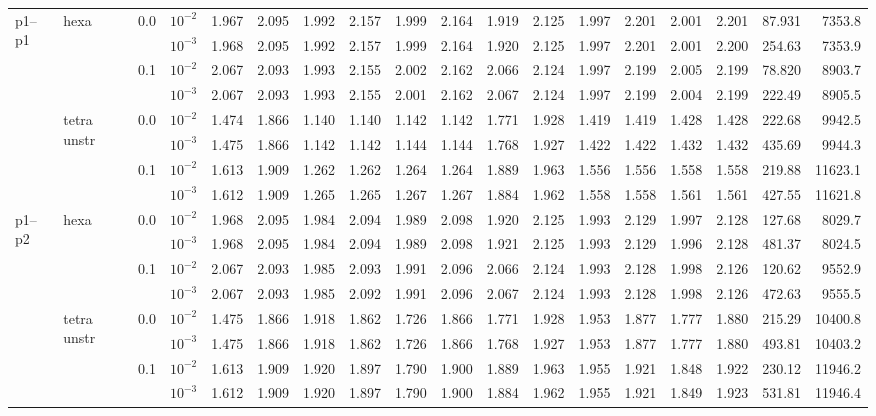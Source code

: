 \begin{longtable}{llclrrrrrrrrrrrrrr}
\multirow{8}{*}{p1--p1} & \multirow{4}{*}{hexa} & \multirow{2}{*}{0.0} & $10^{-2}$ & 1.967 & 2.095 & 1.992 & 2.157 & 1.999 & 2.164 & 1.919 & 2.125 & 1.997 & 2.201 & 2.001 & 2.201 & 87.931 & 7353.8 \\
& & & $10^{-3}$ & 1.968 & 2.095 & 1.992 & 2.157 & 1.999 & 2.164 & 1.920 & 2.125 & 1.997 & 2.201 & 2.001 & 2.200 & 254.63 & 7353.9 \\\cline{3-18}
& & \multirow{2}{*}{0.1} & $10^{-2}$ & 2.067 & 2.093 & 1.993 & 2.155 & 2.002 & 2.162 & 2.066 & 2.124 & 1.997 & 2.199 & 2.005 & 2.199 & 78.820 & 8903.7 \\
& & & $10^{-3}$ & 2.067 & 2.093 & 1.993 & 2.155 & 2.001 & 2.162 & 2.067 & 2.124 & 1.997 & 2.199 & 2.004 & 2.199 & 222.49 & 8905.5 \\\cline{2-18}
& \multirow{4}{*}{tetra unstr} & \multirow{2}{*}{0.0} & $10^{-2}$ & 1.474 & 1.866 & 1.140 & 1.140 & 1.142 & 1.142 & 1.771 & 1.928 & 1.419 & 1.419 & 1.428 & 1.428 & 222.68 & 9942.5 \\
& & & $10^{-3}$ & 1.475 & 1.866 & 1.142 & 1.142 & 1.144 & 1.144 & 1.768 & 1.927 & 1.422 & 1.422 & 1.432 & 1.432 & 435.69 & 9944.3 \\\cline{3-18}
& & \multirow{2}{*}{0.1} & $10^{-2}$ & 1.613 & 1.909 & 1.262 & 1.262 & 1.264 & 1.264 & 1.889 & 1.963 & 1.556 & 1.556 & 1.558 & 1.558 & 219.88 & 11623.1 \\
& & & $10^{-3}$ & 1.612 & 1.909 & 1.265 & 1.265 & 1.267 & 1.267 & 1.884 & 1.962 & 1.558 & 1.558 & 1.561 & 1.561 & 427.55 & 11621.8 \\\hline

\multirow{8}{*}{p1--p2} & \multirow{4}{*}{hexa} & \multirow{2}{*}{0.0} & $10^{-2}$ & 1.968 & 2.095 & 1.984 & 2.094 & 1.989 & 2.098 & 1.920 & 2.125 & 1.993 & 2.129 & 1.997 & 2.128 & 127.68 & 8029.7 \\
& & & $10^{-3}$ & 1.968 & 2.095 & 1.984 & 2.094 & 1.989 & 2.098 & 1.921 & 2.125 & 1.993 & 2.129 & 1.996 & 2.128 & 481.37 & 8024.5 \\\cline{3-18}
& & \multirow{2}{*}{0.1} & $10^{-2}$ & 2.067 & 2.093 & 1.985 & 2.093 & 1.991 & 2.096 & 2.066 & 2.124 & 1.993 & 2.128 & 1.998 & 2.126 & 120.62 & 9552.9 \\
& & & $10^{-3}$ & 2.067 & 2.093 & 1.985 & 2.092 & 1.991 & 2.096 & 2.067 & 2.124 & 1.993 & 2.128 & 1.998 & 2.126 & 472.63 & 9555.5 \\\cline{2-18}
& \multirow{4}{*}{tetra unstr} & \multirow{2}{*}{0.0} & $10^{-2}$ & 1.475 & 1.866 & 1.918 & 1.862 & 1.726 & 1.866 & 1.771 & 1.928 & 1.953 & 1.877 & 1.777 & 1.880 & 215.29 & 10400.8 \\
& & & $10^{-3}$ & 1.475 & 1.866 & 1.918 & 1.862 & 1.726 & 1.866 & 1.768 & 1.927 & 1.953 & 1.877 & 1.777 & 1.880 & 493.81 & 10403.2 \\\cline{3-18}
& & \multirow{2}{*}{0.1} & $10^{-2}$ & 1.613 & 1.909 & 1.920 & 1.897 & 1.790 & 1.900 & 1.889 & 1.963 & 1.955 & 1.921 & 1.848 & 1.922 & 230.12 & 11946.2 \\
& & & $10^{-3}$ & 1.612 & 1.909 & 1.920 & 1.897 & 1.790 & 1.900 & 1.884 & 1.962 & 1.955 & 1.921 & 1.849 & 1.923 & 531.81 & 11946.4 \\\hline


\end{longtable}
